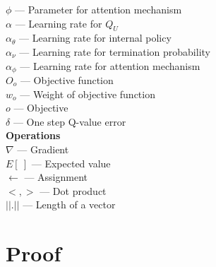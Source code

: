 \documentclass{article}
\begin{document}
	$\phi$ --- Parameter for attention mechanism\\
	$\alpha$ --- Learning rate for $Q_U$\\
	$\alpha_\theta$ --- Learning rate for internal policy\\
	$\alpha_\nu$ --- Learning rate for termination probability\\
	$\alpha_\phi$ --- Learning rate for attention mechanism\\
	$O_o$ --- Objective function\\
	$w_o$ --- Weight of objective function\\
	$o$ --- Objective\\
	$\delta$ --- One step Q-value error\vspace{0.1in}\\
	{\bfseries Operations}\\
	$\nabla$ --- Gradient\\
	$E[\ ]$ --- Expected value\\
	$\leftarrow$ --- Assignment\\
	$<,>$ --- Dot product\\
	$||.||$ --- Length of a vector\\
	\section{Proof}
\end{document}
